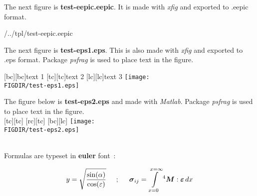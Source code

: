 \documentclass[11pt]{article} %
\begin{document}
 \newlength{\figscale}
 \setlength{\figscale}{0.001in}
 \newcommand{\picfontsize}{\normalsize}
 \newcommand{\FIG}[3]{%
 \setlength{\unitlength}{#1#2}\mbox{} 
 \begin{center} {\picfontsize #3 } \end{center}\mbox{}}
 \newcommand{\FIGDIR}{\MYTEXDIR/../tpl}
 \setlength{\parindent}{0em}
 \pagestyle{empty}

The next {\color{red}figure} is {\bf test-eepic.eepic}.
It is made with {\em xfig} and exported to .eepic format.
\\

\FIG{0.5}{\figscale}{ \FIGDIR/test-eepic.eepic}

The next {\color{red}figure} is {\bf test-eps1.eps}.
This is also made with {\em xfig} and exported to .eps format.
Package {\em psfrag} is used to place text in the figure.
\\

\begin{center}
\psfragscanon
{}[bc][bc]{text 1}
[tc][tc]{text 2}
[lc][lc]{\Large text 3}
\texttt{[image: \\FIGDIR/test-eps1.eps]}
\psfragscanoff
\end{center}

\newpage

The {\color{red}figure} below is {\bf test-eps2.eps} and made 
with {\em Matlab}.
Package {\em psfrag} is used to place text in the figure.
\\

\psfragscanon
{}[tc][tc]{}
[rc][tc]{}
[bc][lc]{}
\texttt{[image: \\FIGDIR/test-eps2.eps]}
\psfragscanoff

~\\

Formulas are typeset in {\bf euler} font~:

\[
   y = \sqrt{\frac{\sin(\alpha)}{\cos(\varepsilon)}}
   \hspace*{5mm};\hspace*{5mm}
   \mbox{\boldmath $\sigma$}_{ij} = 
   \int\limits_{x=0}^{x=\infty} 
   {^4 \mbox{\boldmath $M$}} : \mbox{\boldmath $\varepsilon$} \, dx
\]
\end{document}
